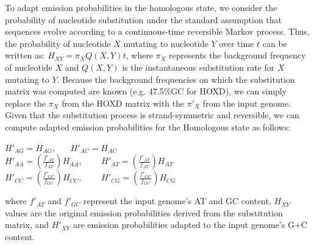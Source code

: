 \documentclass{llncs}
\begin{document}
To adapt emission probabilities in the homologous state, we consider the
probability of nucleotide substitution under the standard assumption
that sequences evolve according to a continuous-time reversible Markov process.
Thus, the probability of nucleotide $X$ mutating to nucleotide $Y$ over time $t$
can be written as: $H_{XY}=\pi_X Q(X,Y)t$, where $\pi_X$ represents the background
frequency of nucleotide $X$ and $Q(X,Y)$ is the instantaneous substitution rate for $X$
mutating to $Y$. Because the background frequencies on which the substitution matrix was computed are
known (e.g. 47.5\%GC for HOXD), we can simply replace the $\pi_X$ from the HOXD matrix
with the $\pi'_X$ from the input genome. Given that the substitution process is
strand-symmetric and reversible, we can compute adapted
emission probabilities for the Homologous state as follows:
\begin{center}
$H'_{AG}=H_{AG}$, \ \ \ $H'_{AC}=H_{AC}$ \\
$H'_{AA}=(\frac{f'_{AT}}{f_{AT}})H_{AA}$, \ \ \ \
$H'_{AT}=(\frac{f'_{AT}}{f_{AT}})H_{AT}$\\
$H'_{CC}=(\frac{f'_{GC}}{f_{GC}})H_{CC}$, \ \ \ \
$H'_{CG}=(\frac{f'_{GC}}{f_{GC}})H_{CG}$\\
\end{center}
where $f'_{AT}$ and $f'_{GC}$ represent the input genome's AT and GC content,
$H_{XY}$ values are the original emission probabilities derived from the
substitution matrix, and $H'_{XY}$ are emission probabilities adapted to
the input genome's G+C content.



\end{document}
